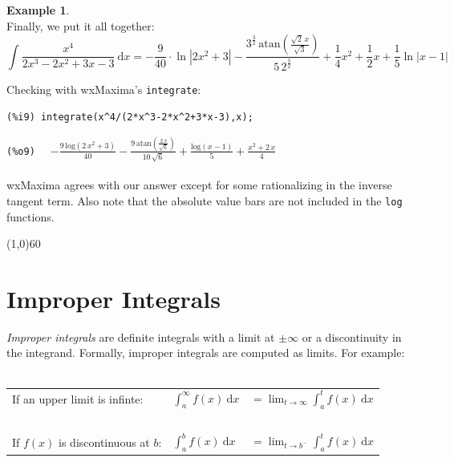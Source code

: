 \documentclass[10.5pt,twoside]{report}
\theoremstyle{definition}
\newtheorem{exmp}{Example}[section]
\begin{document}
\begin{exmp}
${}$\\

Finally, we put it all together:
$$\int \frac{x^4}{2x^3-2x^2+3x-3}\ \mathrm{d}x=-\frac{9}{40}\cdot \ln{|2x^2+3|} -\frac{{3}^{\frac{3}{2}}\,\mathrm{atan}\left( \frac{\sqrt{2}\,x}{\sqrt{3}}\right) }{5\,{2}^{\frac{3}{2}}}+\frac{1}{4}x^2 + \frac{1}{2}x+\frac{1}{5}\ln{|x-1|}$$

Checking with wxMaxima's \verb|integrate|:\\

\begin{verbatim}
(%i9) integrate(x^4/(2*x^3-2*x^2+3*x-3),x);
\end{verbatim}
\verb|(%o9)  |
$-\frac{9\,\mathrm{log}\left( 2\,{x}^{2}+3\right) }{40}-\frac{9\,\mathrm{atan}\left( \frac{2\,x}{\sqrt{6}}\right) }{10\,\sqrt{6}}+\frac{\mathrm{log}\left( x-1\right) }{5}+\frac{{x}^{2}+2\,x}{4}$\\

${}$\\

wxMaxima agrees with our answer except for some rationalizing in the inverse tangent term. Also note that the absolute value bars are not included in the \verb|log| functions.




\end{exmp}

\line(1,0){60}
\linethickness{0.5mm}
\pagebreak



\pagebreak
\section{Improper Integrals}\label{Improper Integrals}

\textit{Improper integrals} are definite integrals with a limit at $\pm \infty$ or a discontinuity in the integrand.  Formally, improper integrals are computed as limits.  For example:\\
${}$\\
\begin{tabular}{l l l}
If an upper limit is infinte: & $\displaystyle \int_a^\infty f(x)\ \mathrm{d}x$ & $=\displaystyle \lim_{t\to \infty} \displaystyle \int_a^t f(x)\ \mathrm{d}x$\\
${}$ & ${}$\\
If $f(x)$ is discontinuous at $b$: & $\displaystyle \int_a^b f(x)\ \mathrm{d}x$ & $=\displaystyle \lim_{t \to b^{-}} \displaystyle \int_a^t f(x)\ \mathrm{d}x$\\ 
\end{tabular}
\end{document}
